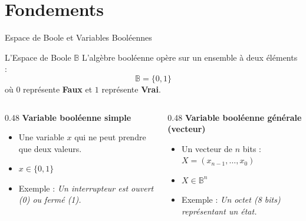 \section{Fondements}

\begin{frame}{Espace de Boole et Variables Booléennes}

    \begin{block}{L'Espace de Boole \(\mathbb{B}\)}
        L'algèbre booléenne opère sur un ensemble à deux éléments :
        \[
            \mathbb{B} = \{0, 1\}
        \]
        où \(0\) représente \textbf{Faux} et \(1\) représente \textbf{Vrai}.
    \end{block}

    \vspace{0.4cm}

    \begin{columns}[T]
        \begin{column}{0.48\textwidth}
            \textbf{Variable booléenne simple}
            \begin{itemize}
                \item Une variable \(x\) qui ne peut prendre que deux valeurs.
                \item \(x \in \{0, 1\}\)
                \item Exemple : \textit{Un interrupteur est ouvert (0) ou fermé (1).}
            \end{itemize}
        \end{column}
        \begin{column}{0.48\textwidth}
            \textbf{Variable booléenne générale (vecteur)}
            \begin{itemize}
                \item Un vecteur de \(n\) bits : \(X = (x_{n-1}, \dots, x_0)\)
                \item \(X \in \mathbb{B}^n\)
                \item Exemple : \textit{Un octet (8 bits) représentant un état.}
            \end{itemize}
        \end{column}
    \end{columns}

\end{frame}


